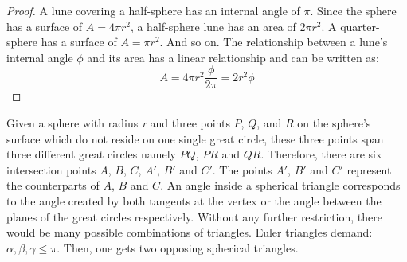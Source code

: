 \begin{proof}
    A lune covering a half-sphere has an internal angle of $\pi$.
    Since the sphere has a surface of $A=4 \pi r^2$, a half-sphere lune has an area of $2 \pi r^2$.
    A quarter-sphere has a surface of $A=\pi r^2$. And so on.
    The relationship between a lune's internal angle $\phi$ and its area has a linear relationship
    and can be written as:
    \begin{equation}
        A = 4 \pi r^2 \frac{\phi}{2\pi} = 2 r^2 \phi
    \end{equation}
\end{proof}

\begin{definition}
    Given a sphere with radius \emph{r} and three points $P$, $Q$, and $R$ on the sphere's surface 
    which do not reside on one single great circle, these three points span three 
    different great circles namely $PQ$, $PR$ and $QR$.
    Therefore, there are six intersection points $A$, $B$, $C$, $A'$, $B'$ and $C'$.
    The points $A'$, $B'$ and $C'$ represent the counterparts of $A$, $B$ and $C$.
    An angle inside a spherical triangle corresponds to the angle created by both tangents 
    at the vertex or the angle between the planes of the great circles respectively.
    Without any further restriction, there would be many possible combinations of triangles.
    Euler triangles demand: $\alpha, \beta, \gamma \le \pi$.
    Then, one gets two opposing spherical triangles.
\end{definition}
